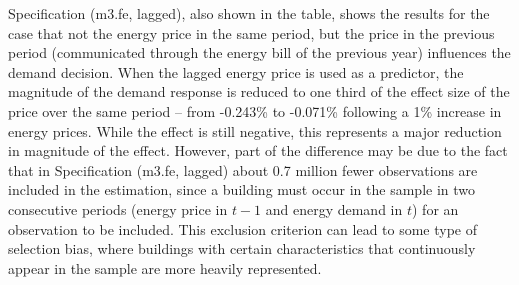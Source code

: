 \documentclass[12pt,twoside]{reedthesis}
\begin{document}
Specification (m3.fe, lagged), also shown in the table, shows the results for the case that not the energy price in the same period, but the price in the previous period (communicated through the energy bill of the previous year) influences the demand decision. When the lagged energy price is used as a predictor, the magnitude of the demand response is reduced to one third of the effect size of the price over the same period -- from -0.243\% to -0.071\% following a 1\% increase in energy prices. While the effect is still negative, this represents a major reduction in magnitude of the effect. However, part of the difference may be due to the fact that in Specification (m3.fe, lagged) about 0.7 million fewer observations are included in the estimation, since a building must occur in the sample in two consecutive periods (energy price in \(t-1\) and energy demand in \(t\)) for an observation to be included. This exclusion criterion can lead to some type of selection bias, where buildings with certain characteristics that continuously appear in the sample are more heavily represented.
\end{document}

